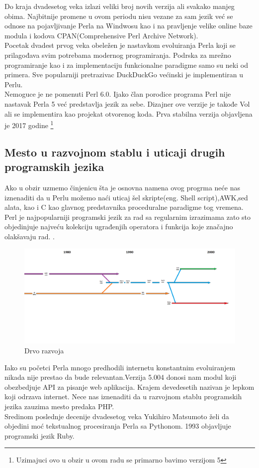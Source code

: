\documentclass[12pt]{article}
\begin{document}
Do kraja dvadesetog veka izlazi veliki broj novih verzija ali svakako manjeg obima. Najbitnije promene u ovom periodu nisu vezane za sam jezik već se odnose na pojavljivanje Perla na Windwosu kao i na pravljenje velike online baze modula i kodova CPAN(Comprehensive Perl Archive Network).\\
Pocetak dvadest prvog veka obeležen je nastavkom evoluiranja Perla koji se prilagođava svim potrebama modernog programiranja. Podrska za mrežno programiranje kao i za implementaciju funkcionalne paradigme samo su neki od primera. Sve popularniji pretrazivac DuckDuckGo većinski je implementiran u Perlu\cite{duck}.\\
Nemoguce je ne pomenuti Perl 6.0. Ijako član porodice programa Perl nije nastavak Perla 5 već predstavlja jezik za sebe. Dizajner ove verzije je takođe Vol ali se implementira kao projekat otvorenog koda. Prva stabilna verzija objavljena je 2017 godine \footnote[1]{Uzimajuci ovo u obzir u ovom radu se primarno bavimo verzijom 5}

\subsection{Mesto u razvojnom stablu i uticaji drugih programskih jezika}



Ako u obzir uzmemo činjenicu šta je osnovna namena ovog progrma neće nas iznenaditi da u  Perlu možemo naći uticaj šel skripte(eng. Shell script),AWK,sed alata, kao i C kao glavnog predstavnika proceduralne paradigme tog vremena. Perl je najpopularniji programski jezik za rad sa regularnim izrazimama zato sto objedinjuje najveću kolekciju ugrađenjih operatora i funkcija koje značajno olakšavaju rad. \cite{friedl2006mastering}.\\

\begin{figure}[H]
\centering
\includegraphics[scale=0.25,angle=90]{drvoRazvoja.png}
\caption{Drvo razvoja}
\end{figure}
Iako su početci Perla mnogo predhodili internetu konstantnim evoluiranjem nikada nije prestao da bude relevantan.Verzija 5.004 donosi nam modul koji obezbedjuje API za pisanje web aplikacija. Krajem devedesetih nazivan je lepkom koji odrzava internet. Nece nas iznenaditi da u razvojnom stablu programskih jezika zauzima mesto predaka PHP.\\
Sredinom poslednje decenije dvadesetog veka Yukihiro Matsumoto želi da objedini moć tekstualnog procesiranja Perla sa Pythonom. 1993 objavljuje programski jezik Ruby.
\end{document}
